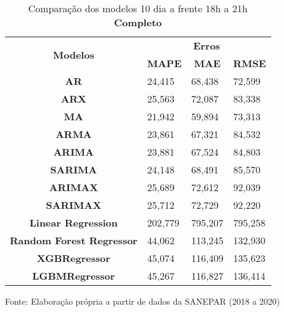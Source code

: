 \begin{table}[H]
	\centering
	\caption{Comparação dos modelos 10 dia a frente 18h a 21h \textbf{Completo} }\label{tb:10-18cm}
	\begin{tabular}{@{}clll@{}}
		\toprule
		\multirow{2}{*}{\textbf{Modelos}} & \multicolumn{3}{c}{\textbf{Erros}}                                                                       \\ \cmidrule(l){2-4} 
		& \multicolumn{1}{c}{\textbf{MAPE}} & \multicolumn{1}{c}{\textbf{MAE}} & \multicolumn{1}{c}{\textbf{RMSE}} \\ \hline
\textbf{AR}                       & 24,415                            & 68,438                           & 72,599                            \\
\textbf{ARX}                      & 25,563                            & 72,087                           & 83,338                            \\
\textbf{MA}                       & 21,942                            & 59,894                           & 73,313                            \\
\textbf{ARMA}                     & 23,861                            & 67,321                           & 84,532                            \\
\textbf{ARIMA}                    & 23,881                            & 67,524                           & 84,803                            \\
\textbf{SARIMA}                   & 24,148                            & 68,491                           & 85,570                            \\
\textbf{ARIMAX}                   & 25,689                            & 72,612                           & 92,039                            \\
\textbf{SARIMAX}                  & 25,712                            & 72,729                           & 92,220                            \\
\textbf{Linear Regression}        & 202,779                           & 795,207                          & 795,258                           \\
\textbf{Random Forest Regressor}  & 44,062                            & 113,245                          & 132,930                           \\
\textbf{XGBRegressor}             & 45,074                            & 116,409                          & 135,623                           \\
\textbf{LGBMRegressor}            & 45,267                            & 116,827                          & 136,414                           \\ \bottomrule
	\end{tabular}

Fonte: Elaboração própria a partir de dados da SANEPAR (2018 a 2020)
\end{table}



